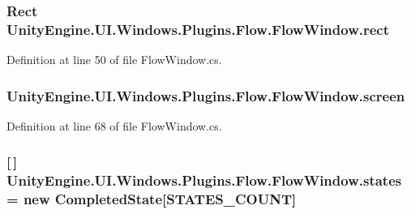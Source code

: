 \subsubsection[{rect}]{\setlength{\rightskip}{0pt plus 5cm}Rect Unity\+Engine.\+U\+I.\+Windows.\+Plugins.\+Flow.\+Flow\+Window.\+rect}\label{class_unity_engine_1_1_u_i_1_1_windows_1_1_plugins_1_1_flow_1_1_flow_window_a598904f0473628edea291fea82dc2a5b}


Definition at line 50 of file Flow\+Window.\+cs.

\hypertarget{class_unity_engine_1_1_u_i_1_1_windows_1_1_plugins_1_1_flow_1_1_flow_window_a112a7288a0d2ab66cf632937c34684ff}{}
\subsubsection[{screen}]{ Unity\+Engine.\+U\+I.\+Windows.\+Plugins.\+Flow.\+Flow\+Window.\+screen}\label{class_unity_engine_1_1_u_i_1_1_windows_1_1_plugins_1_1_flow_1_1_flow_window_a112a7288a0d2ab66cf632937c34684ff}


Definition at line 68 of file Flow\+Window.\+cs.

\hypertarget{class_unity_engine_1_1_u_i_1_1_windows_1_1_plugins_1_1_flow_1_1_flow_window_a704561c1b31a3ed58230649c449cd6d1}{}
\subsubsection[{states}]{ \mbox{[}$\,$\mbox{]} Unity\+Engine.\+U\+I.\+Windows.\+Plugins.\+Flow.\+Flow\+Window.\+states = new {\bf Completed\+State}\mbox{[}S\+T\+A\+T\+E\+S\+\_\+\+C\+O\+U\+N\+T\mbox{]}}\label{class_unity_engine_1_1_u_i_1_1_windows_1_1_plugins_1_1_flow_1_1_flow_window_a704561c1b31a3ed58230649c449cd6d1}


